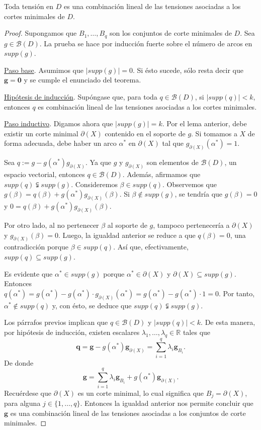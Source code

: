 \begin{teo}  \label{teo:tensiones}
Toda tensión en $D$ es una combinación lineal de las tensiones asociadas a los cortes minimales de $D$.
\end{teo}
\begin{proof}
Supongamos que $B_{1}, \ldots, B_{q}$ son los conjuntos de corte minimales de $D$.
Sea \\$g \in \mathcal{B}(D)$. La prueba se hace por inducción fuerte sobre el número de arcos en $supp(g)$.

\underline{Paso base}. Asumimos que $|supp(g)| = 0$. Si ésto sucede, sólo resta decir que $\mathbf{g}= \mathbf{0}$ y se cumple el enunciado del teorema.

\underline{Hipótesis de inducción}. Supóngase que, para toda $q \in \mathcal{B}(D)$, si $|supp(q)|< k$, entonces $q$ es combinación lineal de las tensiones asociadas a los cortes minimales.

\underline{Paso inductivo}. Digamos ahora que $|supp(g)| = k$. Por el lema anterior, debe existir un corte minimal $\partial(X)$ contenido en el soporte de $g$. Si tomamos a $X$ de forma adecuada, debe haber un arco $\alpha^{*}$ en $\partial(X)$ tal que $g_{\partial(X)}(\alpha^{*})= 1$. 

Sea $q:=g - g(\alpha^{*})g_{\partial(X)}$. Ya que $g$ y $g_{\partial(X)}$ son elementos de $\mathcal{B}(D)$, un espacio vectorial, entonces $q \in \mathcal{B}(D)$. Además, afirmamos que $supp(q)\subsetneqq supp(g)$. Consideremos $\beta \in supp(q)$. Observemos que $g(\beta) = q(\beta) + g(\alpha^{*})g_{\partial(X)}(\beta)$. Si $\beta \notin supp(g)$, se tendría que  $g(\beta)=0$ y  $0 = q(\beta) + g(\alpha^{*})g_{\partial(X)}(\beta)$. 

Por otro lado, al no pertenecer $\beta$ al soporte de $g$, tampoco pertenecería a $\partial(X)$ y $g_{\partial(X)}(\beta) = 0$. Luego, la igualdad anterior se reduce a que $q(\beta)= 0$, una contradicción porque $\beta \in supp(q)$. Así que, efectivamente, $supp(q) \subseteq supp(g)$.

Es evidente que $\alpha^{*} \in supp(g)$ porque $\alpha^{*} \in \partial(X)$ y $\partial(X) \subseteq supp(g)$. Entonces \\$q(\alpha^{*}) = g(\alpha^{*}) - g(\alpha^{*})\cdot g_{\partial(X)}(\alpha^{*}) = g(\alpha^{*}) - g(\alpha^{*})\cdot1 = 0$. Por tanto, $\alpha^{*} \notin supp(q)$ y, con ésto, se deduce que $supp(q) \subsetneqq supp(g)$.

Los párrafos previos implican que $q \in \mathcal{B}(D)$ y $|supp(q)|<k$. De esta manera, por hipótesis de inducción, existen escalares $\lambda_{1}, \ldots, \lambda_{q} \in \mathbb{R}$ tales que 
$$
\mathbf{q} = \mathbf{g} - g(\alpha^{*})\mathbf{g}_{\partial(X)} = \sum_{i=1}^{q} \lambda_{i}\mathbf{g}_{B_{i}}.
$$
De donde
$$
\mathbf{g} = \sum_{i=1}^{q} \lambda_{i}\mathbf{g}_{B_{i}} + g(\alpha^{*})\mathbf{g}_{\partial(X)}.
$$
Recuérdese que $\partial(X)$ es un corte minimal, lo cual significa que $B_{j}=\partial(X)$, para alguna $j \in \{1, \ldots, q\}$. Entonces la igualdad anterior nos permite concluir que $\mathbf{g}$ es una combinación lineal de las tensiones asociadas a los conjuntos de corte minimales.

\end{proof}

